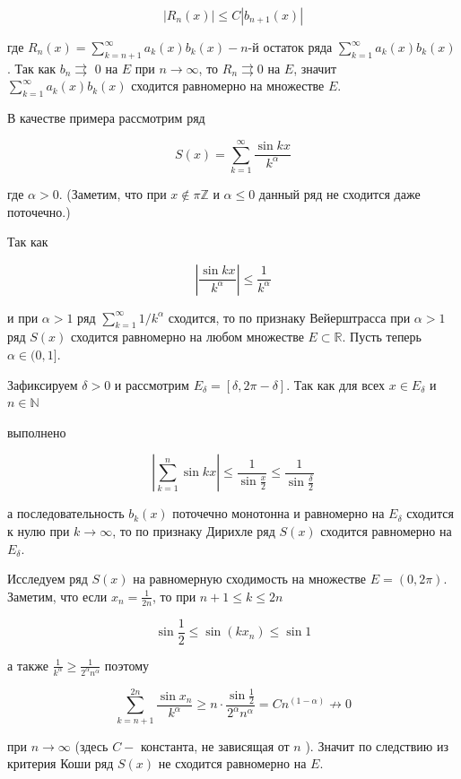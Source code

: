 \documentclass[a4paper,12pt]{article} %
\begin{document}
	$$
	\left|R_{n}(x)\right| \leq C\left|b_{n+1}(x)\right|
	$$
	
	где $R_{n}(x)=\sum_{k=n+1}^{\infty} a_{k}(x) b_{k}(x)-n$-й остаток ряда $\sum_{k=1}^{\infty} a_{k}(x) b_{k}(x)$. Так как $b_{n} \rightrightarrows$ 0 на $E$ при $n \rightarrow \infty$, то $R_{n} \rightrightarrows 0$ на $E$, значит $\sum_{k=1}^{\infty} a_{k}(x) b_{k}(x)$ сходится равномерно на множестве $E$.
	
	В качестве примера рассмотрим ряд
	
	$$
	S(x)=\sum_{k=1}^{\infty} \frac{\sin k x}{k^{\alpha}}
	$$
	
	где $\alpha>0$. (Заметим, что при $x \notin \pi \mathbb{Z}$ и $\alpha \leq 0$ данный ряд не сходится даже поточечно.)
	
	Так как
	
	$$
	\left|\frac{\sin k x}{k^{\alpha}}\right| \leq \frac{1}{k^{\alpha}}
	$$
	
	и при $\alpha>1$ ряд $\sum_{k=1}^{\infty} 1 / k^{\alpha}$ сходится, то по признаку Вейерштрасса при $\alpha>1$ ряд $S(x)$ сходится равномерно на любом множестве $E \subset \mathbb{R}$. Пусть теперь $\alpha \in(0,1]$.
	
	Зафиксируем $\delta>0$ и рассмотрим $E_{\delta}=[\delta, 2 \pi-\delta]$. Так как для всех $x \in E_{\delta}$ и $n \in \mathbb{N}$
	
	выполнено
	
	$$
	\left|\sum_{k=1}^{n} \sin k x\right| \leq \frac{1}{\sin \frac{x}{2}} \leq \frac{1}{\sin \frac{\delta}{2}}
	$$
	
	а последовательность $b_{k}(x)$ поточечно монотонна и равномерно на $E_{\delta}$ сходится к нулю при $k \rightarrow \infty$, то по признаку Дирихле ряд $S(x)$ сходится равномерно на $E_{\delta}$.
	
	Исследуем ряд $S(x)$ на равномерную сходимость на множестве $E=(0,2 \pi)$. Заметим, что если $x_{n}=\frac{1}{2 n}$, то при $n+1 \leq k \leq 2 n$
	
	$$
	\sin \frac{1}{2} \leq \sin \left(k x_{n}\right) \leq \sin 1
	$$
	
	а также $\frac{1}{k^{\alpha}} \geq \frac{1}{2^{\alpha} n^{\alpha}}$ поэтому
	
	$$
	\sum_{k=n+1}^{2 n} \frac{\sin x_{n}}{k^{\alpha}} \geq n \cdot \frac{\sin \frac{1}{2}}{2^{\alpha} n^{\alpha}}=C n^{(1-\alpha)} \not \rightarrow 0
	$$
	
	при $n \rightarrow \infty$ (здесь $C-$ константа, не зависящая от $n$ ). Значит по следствию из критерия Коши ряд $S(x)$ не сходится равномерно на $E$.
	
\end{document}
